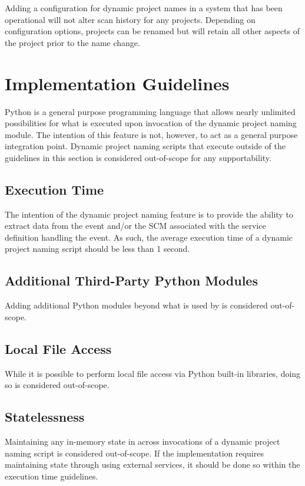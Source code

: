 Adding a configuration for dynamic project names in a system that has been operational will not alter scan history
for any projects.  Depending on configuration options, projects can be renamed but will retain all other aspects
of the project prior to the name change.


\section{Implementation Guidelines}

Python is a general purpose programming language that allows nearly unlimited possibilities for what is
executed upon invocation of the dynamic project naming module.  The intention of this feature is not, however,
to act as a general purpose integration point.  Dynamic project naming scripts that execute outside of the
guidelines in this section is considered out-of-scope for any supportability.

\subsection{Execution Time}

The intention of the dynamic project naming feature is to provide the ability to extract data from the
event and/or the SCM associated with the service definition handling the event.  As such, the
average execution time of a dynamic project naming script should be less than 1 second.

\subsection{Additional Third-Party Python Modules}

Adding additional Python modules beyond what is used by \cxoneflow is considered out-of-scope.

\subsection{Local File Access}

While it is possible to perform local file access via Python built-in libraries, doing so
is considered out-of-scope.

\subsection{Statelessness}

Maintaining any in-memory state in across invocations of a dynamic project naming script is considered out-of-scope.
If the implementation requires maintaining state through using external services, it should be done so within the
execution time guidelines.

